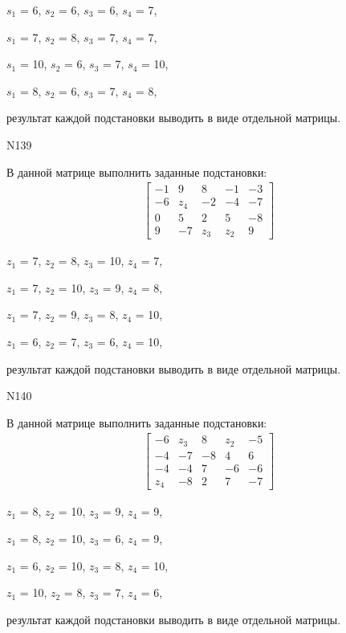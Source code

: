\documentclass[11pt]{report}
\begin{document}
$s_{1}$ = 6, $s_{2}$ = 6, $s_{3}$ = 6, $s_{4}$ = 7, 

$s_{1}$ = 7, $s_{2}$ = 8, $s_{3}$ = 7, $s_{4}$ = 7, 

$s_{1}$ = 10, $s_{2}$ = 6, $s_{3}$ = 7, $s_{4}$ = 10, 

$s_{1}$ = 8, $s_{2}$ = 6, $s_{3}$ = 7, $s_{4}$ = 8, 

результат каждой подстановки выводить в виде отдельной матрицы.

N139

В данной матрице выполнить заданные подстановки:
\begin{align*}
\left[\begin{matrix}-1 & 9 & 8 & -1 & -3\\-6 & z_{4} & -2 & -4 & -7\\0 & 5 & 2 & 5 & -8\\9 & -7 & z_{3} & z_{2} & 9\end{matrix}\right]
\end{align*}


$z_{1}$ = 7, $z_{2}$ = 8, $z_{3}$ = 10, $z_{4}$ = 7, 

$z_{1}$ = 7, $z_{2}$ = 10, $z_{3}$ = 9, $z_{4}$ = 8, 

$z_{1}$ = 7, $z_{2}$ = 9, $z_{3}$ = 8, $z_{4}$ = 10, 

$z_{1}$ = 6, $z_{2}$ = 7, $z_{3}$ = 6, $z_{4}$ = 10, 

результат каждой подстановки выводить в виде отдельной матрицы.

N140

В данной матрице выполнить заданные подстановки:
\begin{align*}
\left[\begin{matrix}-6 & z_{3} & 8 & z_{2} & -5\\-4 & -7 & -8 & 4 & 6\\-4 & -4 & 7 & -6 & -6\\z_{4} & -8 & 2 & 7 & -7\end{matrix}\right]
\end{align*}


$z_{1}$ = 8, $z_{2}$ = 10, $z_{3}$ = 9, $z_{4}$ = 9, 

$z_{1}$ = 8, $z_{2}$ = 10, $z_{3}$ = 6, $z_{4}$ = 9, 

$z_{1}$ = 6, $z_{2}$ = 10, $z_{3}$ = 8, $z_{4}$ = 10, 

$z_{1}$ = 10, $z_{2}$ = 8, $z_{3}$ = 7, $z_{4}$ = 6, 

результат каждой подстановки выводить в виде отдельной матрицы.
\end{document}
